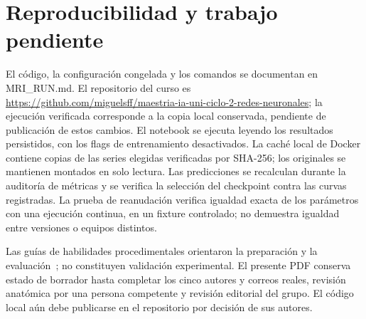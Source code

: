 \section{Reproducibilidad y trabajo pendiente}
El código, la configuración congelada y los comandos se documentan en MRI\_RUN.md.
El repositorio del curso es \url{https://github.com/miguelsff/maestria-ia-uni-ciclo-2-redes-neuronales};
la ejecución verificada corresponde a la copia local conservada, pendiente de publicación de estos cambios.
El notebook se ejecuta leyendo los resultados persistidos, con los flags de entrenamiento desactivados.
La caché local de Docker contiene copias de las series elegidas verificadas por SHA-256;
los originales se mantienen montados en solo lectura. Las predicciones se recalculan durante la auditoría
de métricas y se verifica la selección del checkpoint contra las curvas registradas.
La prueba de reanudación verifica igualdad exacta de los parámetros con una ejecución continua,
en un fixture controlado; no demuestra igualdad entre versiones o equipos distintos.

Las guías de habilidades procedimentales orientaron la preparación y la evaluación~\cite{skills};
no constituyen validación experimental. El presente PDF conserva estado de borrador hasta completar
los cinco autores y correos reales, revisión anatómica por una persona competente y revisión editorial del grupo.
El código local aún debe publicarse en el repositorio por decisión de sus autores.



